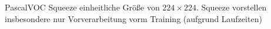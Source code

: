 PascalVOC Squeeze einheitliche Größe von $224 \times 224$.
Squeeze vorstellen
insbesondere nur Vorverarbeitung vorm Training (aufgrund Laufzeiten)

